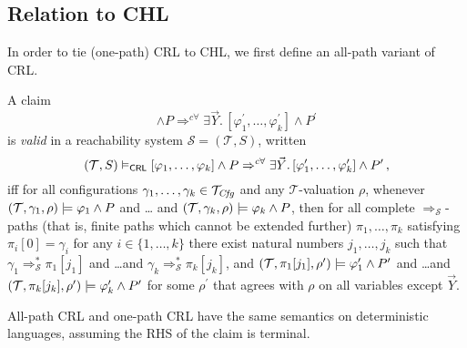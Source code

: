 \subsection{Relation to CHL}\label{app:reltoCHL}

In order to tie (one-path) CRL to CHL, we first define an all-path variant of CRL.
\begin{definition}\label{def:apCRLsemantics}
    A claim
    \begin{equation*}
     [\varphi_1,\ldots,\varphi_k] \land P
     \Rightarrow^{c\forall} \exists \vec{Y}.\, [\varphi^\prime_1,\ldots,\varphi^\prime_k] \land P^\prime
    \end{equation*}
    is \emph{valid} in a reachability system $\mathcal{S} = (\mathcal{T}, S)$,
    written
    \begin{equation*}
        (\mathcal{T}, S) \vDash_{\mathsf{CRL}} [\varphi_1,\ldots,\varphi_k] \land P
     \Rightarrow^{c\forall} \exists \vec{Y}.\, [\varphi^\prime_1,\ldots,\varphi^\prime_k] \land P^\prime \, ,
    \end{equation*}
    iff for all configurations $\gamma_1,\ldots,\gamma_k \in \mathcal{T}_{\mathit{Cfg}}$
    and any $\mathcal{T}$-valuation $\rho$,
    whenever $(\mathcal{T}, \gamma_1,\rho) \models \varphi_1 \land P$ and \ldots
    and $(\mathcal{T}, \gamma_k,\rho) \models \varphi_k \land P$,
    then for all complete $\Rightarrow_{\mathcal{S}}$-paths (that is, finite paths which cannot be extended further)
    $\pi_1,\ldots,\pi_k$
    satisfying $\pi_i[0] = \gamma_i$ for any $i \in \{ 1, \ldots, k \}$
    there exist natural numbers $j_1, \ldots, j_k$
    such that $\gamma_1 \Rightarrow^{*}_{\mathcal{S}} \pi_1[j_1]$
    and \ldots and $\gamma_k \Rightarrow^{*}_{\mathcal{S}} \pi_k[j_k]$,
    and $(\mathcal{T}, \pi_1[j_1], \rho^\prime) \models \varphi^\prime_1 \land P^\prime$
    and \ldots and $(\mathcal{T}, \pi_k[j_k], \rho^\prime) \models \varphi^\prime_k \land P^\prime$
    for some $\rho^\prime$ that agrees with $\rho$ on all variables except $\vec{Y}$.
\end{definition}

All-path CRL and one-path CRL have the same semantics on deterministic languages, assuming the RHS of the claim is terminal.

